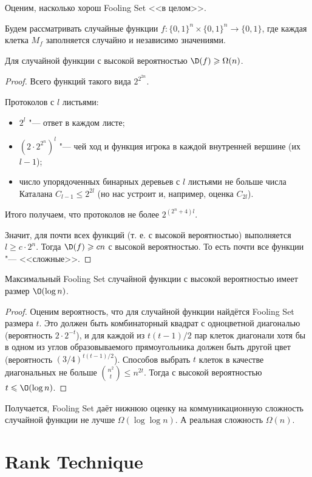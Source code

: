 Оценим, насколько хорош Fooling Set <<в целом>>.

Будем рассматривать случайные функции $f\colon \{0, 1\}^n\times \{0, 1\}^n\to \{0, 1\}$, где каждая клетка $M_f$ заполняется случайно и независимо значениями.

\begin{theorem}
Для случайной функции с высокой вероятностью $\D(f)\geqslant\Omega(n)$.
\end{theorem}
\begin{proof}
Всего функций такого вида $2^{2^{2n}}$.

Протоколов с $l$ листьями:
\begin{itemize}
    \item $2^l$ "--- ответ в каждом листе;
    \item $(2\cdot 2^{2^n})^l$ "--- чей ход и функция игрока в каждой внутренней вершине (их $l - 1$);
    \item число упорядоченных бинарных деревьев с $l$ листьями не больше числа Каталана $C_{l - 1} \leqslant 2^{2l}$ (но нас устроит и, например, оценка $C_{2l}$).
\end{itemize}
Итого получаем, что протоколов не более $2^{(2^n + 4) l}$.

Значит, для почти всех функций (т. е. с высокой вероятностью) выполняется $l\geqslant c\cdot 2^n$. Тогда $\D(f)\geqslant cn$ с высокой вероятностью. То есть почти все функции "--- <<сложные>>.
\end{proof}

\begin{theorem}
Максимальный Fooling Set случайной функции с высокой вероятностью имеет размер $\O(\log n)$.
\end{theorem}
\begin{proof}
Оценим вероятность, что для случайной функции найдётся Fooling Set размера $t$.
Это должен быть комбинаторный квадрат с одноцветной диагональю (вероятность $2\cdot 2^{-t}$), и для каждой из $t(t-1)/2$ пар клеток диагонали хотя бы в одном из углов образовываемого прямоугольника должен быть другой цвет (вероятность $(3/4)^{t(t-1)/2}$). Способов выбрать $t$ клеток в качестве диагональных не больше $\binom{n^2}{t} \leqslant n^{2t}$.
Тогда с высокой вероятностью $t\leqslant \O(\log n)$.
\end{proof}

Получается, Fooling Set даёт нижнюю оценку на коммуникационную сложность случайной функции не лучше $\Omega(\log\log n)$. А реальная сложность $\Omega(n)$.

\section{Rank Technique}

